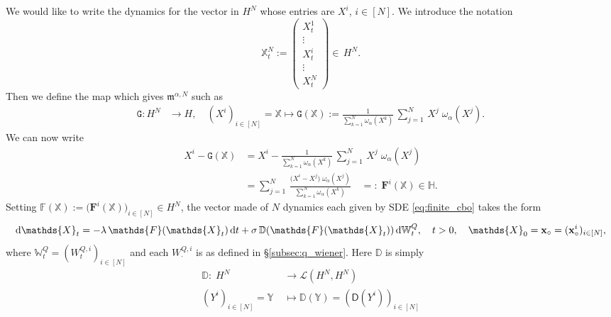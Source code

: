 \documentclass[12pt]{amsart}
\newcommand{\D}[1]{\mbox{\rm #1}}
\newcommand{\dd}{\D{d}}
\numberwithin{equation}{section}
\begin{document}
We would like to write the dynamics for the vector in $H^N$ whose entries are $X^i$, $i\in[N]$. We introduce the notation  
\begin{equation}\label{X H N}
    \mathds{X}^{N}_{t} := 
    \begin{pmatrix}
    X^{1}_{t}\\
    \vdots\\
    X^{i}_{t}\\
    \vdots\\
    X^{N}_{t}
    \end{pmatrix}
    \in \, H^{N}.
\end{equation}
Then we define the map which gives $\mathfrak{m}^{\alpha,N}$ such as
\begin{equation}\label{G}
\begin{aligned}
    \mathtt{G}:H^{N} & \longrightarrow H, \quad
    (X^{i})_{i\in [N]}=\mathds{X}  \longmapsto \mathtt{G}(\mathds{X}) := \frac{1}{\sum\limits_{k=1}^{N}\omega_{\alpha}(X^{k})} \, \sum\limits_{j=1}^{N}\,X^{j}\; \omega_{\alpha}(X^{j}).
\end{aligned}
\end{equation}
We can now write
\begin{equation}
\label{eq:mathds F}
\begin{aligned}
    X^{i} - \mathtt{G}(\mathds{X}) 
    & =  X^{i} - \frac{1}{\sum\limits_{k=1}^{N}\omega_{\alpha}(X^{k})} \, \sum\limits_{j=1}^{N}\,X^{j}\; \omega_{\alpha}(X^{j})\\ 
    & = \sum\limits_{j=1}^{N}\,\frac{\big(X^{i}-X^{j}\big)\; \omega_{\alpha}(X^{j})}{\sum\limits_{k=1}^{N}\omega_{\alpha}(X^{k})} \quad =: \; \mathbf{F}^{i}(\mathds{X}) \in \mathbb{H}.
\end{aligned}
\end{equation}
Setting $\mathds{F}(\mathds{X}):=\big( \mathbf{F}^{i}(\mathds{X}) \big)_{i\in [N]} \in H^{N}$, the vector made of $N$ dynamics each given by SDE \eqref{eq:finite_cbo} takes the form 
\begin{equation}\label{CBO in H N F}
    \dd \mathds{X}_{t} = -\lambda \, \mathds{F}(\mathds{X}_{t}) \, \dd t + \sigma\, \mathbb{D}(\mathds{F}(\mathds{X}_{t})) \, \dd \mathbb{W}^{Q}_{t},\quad t>0, \quad \mathds{X}_{0}=\mathbf{x}_{\circ}=(\mathbf{x}^{i}_{\circ})_{i\in[N]},
\end{equation}
where $\mathbb{W}^{Q}_{t} = (W^{Q,i}_{t})_{i\in [N]}$ and each $W^{Q,i}_{\cdot}$ is as defined in \S\ref{subsec:q_wiener}. Here $\mathbb{D}$ is simply
\begin{equation*}
\begin{aligned}
     \mathbb{D}: \; H^{N} & \longrightarrow \mathscr{L}(H^{N},H^{N})\\
    (Y^{i})_{i\in [N]}=\mathds{Y} \;& \longmapsto \mathbb{D}(\mathds{Y}) = (\mathsf{D}(Y^{i}))_{i\in[N]}
\end{aligned}
\end{equation*}
\end{document}
